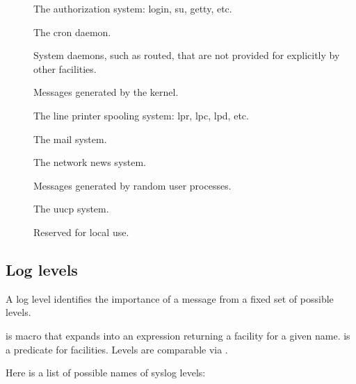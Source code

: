 \begin{description}
\item[]
  The authorization system: login, su, getty, etc.

\item[]
  The cron daemon.

\item[]
  System daemons, such as routed, that are not provided for explicitly
  by other facilities.

\item[]
  Messages generated by the kernel.

\item[]
  The line printer spooling system: lpr, lpc, lpd, etc.

\item[]
  The mail system.

\item[]
  The network news system.

\item[]
  Messages generated by random user processes.

\item[]
  The uucp system.

\item[       ]
  Reserved for local use.
\end{description}
                                
\subsection*{Log levels}

A log level identifies the importance of a message from a fixed set
of possible levels.

%
\begin{desc}
   is macro that expands into an expression returning
  a facility for a given name.   is a predicate for
  facilities.  Levels are comparable via .
\end{desc}
%
Here is a list of possible names of syslog levels:

